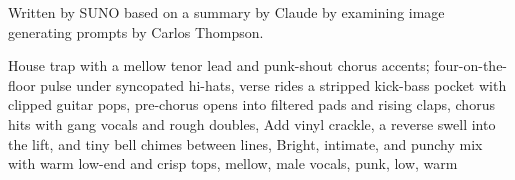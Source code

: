 
\begin{notes}
Written by SUNO based on a summary by Claude by examining image generating prompts by Carlos Thompson.
\end{notes}
\begin{style}
House trap with a mellow tenor lead and punk-shout chorus accents; four-on-the-floor pulse under syncopated hi-hats, verse rides a stripped kick-bass pocket with clipped guitar pops, pre-chorus opens into filtered pads and rising claps, chorus hits with gang vocals and rough doubles, Add vinyl crackle, a reverse swell into the lift, and tiny bell chimes between lines, Bright, intimate, and punchy mix with warm low-end and crisp tops, mellow, male vocals, punk, low, warm
\end{style}
